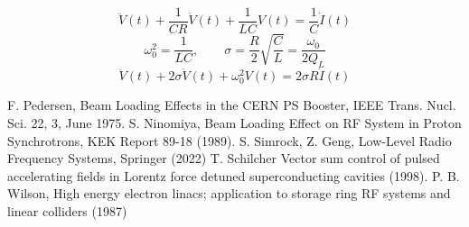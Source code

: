 \documentclass[book]{jlreq}
\begin{document}
%
\begin{equation}
    \ddot{V}(t) + \frac{1}{CR}\dot{V}(t) + \frac{1}{LC} V(t) = \frac{1}{C}\dot{I}(t)
\end{equation}
%
\begin{equation}
    \omega_0^2 = \frac{1}{LC}, \qquad \sigma = \frac{R}{2}\sqrt{\frac{C}{L}} = \frac{\omega_0}{2Q_L}
\end{equation}
%
\begin{equation}
    \ddot{V}(t) + 2 \sigma \dot{V}(t) + \omega_0^2 V(t) = 2\sigma R \dot{I}(t)
\end{equation}
%
\begin{thebibliography}{9}
    F. Pedersen, Beam Loading Effects in the CERN PS Booster, IEEE Trans. Nucl. Sci. 22, 3, June 1975.
    S. Ninomiya, Beam Loading Effect on RF System in Proton Synchrotrons, KEK Report 89-18 (1989).
    S. Simrock, Z. Geng, Low-Level Radio Frequency Systems, Springer (2022)
    T. Schilcher Vector sum control of pulsed accelerating fields in Lorentz force detuned superconducting cavities (1998).
    P. B. Wilson, High energy electron linacs; application to storage ring RF systems and linear colliders (1987)
\end{thebibliography}
%
%
\end{document}
